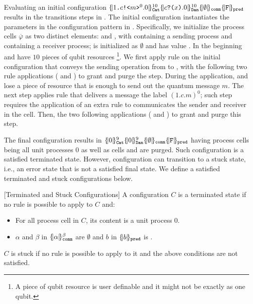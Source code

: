 Evaluating an initial configuration
{
$\pcell{\qsend{1}{c}{m}^0.0}{10}{\cn{Cat}}
\pcell{\qrev{c}{x}.0}{10}{\cn{Dan}} 
\qcell{\emptyset}{\cn{comm}}
\qcell{\texttt{F}}{\cn{pred}}$
}
results in the transitions steps in .
The initial configuration instantiates the parameters in the configuration pattern in .
Specifically, we initialize the process cells $\overline{\varphi}$ as two distinct elements:  and ,
with  containing a sending process and  containing a receiver process; 
 is initialized as $\emptyset$ and  has value .
In the beginning  and  have $10$ pieces of qubit resources \footnote{A piece of qubit resource is user definable and it might not be exactly as one qubit.}.
We first apply rule  on the initial configuration
that conveys the sending operation from  to ,
with the following two rule applications ( and ) to grant and purge the  step.
During the  application,  and  lose a piece of resource that is enough to send out the quantum message $m$. 
The next step applies rule  that delivers a message the label $(1.c.m)^0$;
such step requires the application of an extra rule  to communicates the sender and receiver in the  cell.
Then, the two following applications ( and ) to grant and purge this step.

The final configuration results in $\pcell{0}{9}{\cn{Cat}}
\pcell{0}{9}{\cn{Dan}} 
\qcell{\emptyset}{\cn{comm}}
\qcell{\texttt{F}}{\cn{pred}}$
having process cells being all unit processes $0$ as well as cells  and  are purged.
Such configuration is a satisfied terminated state. However, configuration can transition to a stuck state, i.e., an error state that is not a satisfied final state.
We define a satisfied terminated and stuck configurations below.

\begin{definition}\label{def:stuck}\rm[Terminated and Stuck Configurations]
A configuration $C$ is a terminated state if no rule is possible to apply to $C$ and:
\begin{itemize}
\item For all process cell in $C$, its content is a unit process $0$.
\item $\alpha$ and $\beta$ in $\{\!| \alpha |\!\}^{\beta}_{\texttt{comm}}$ are $\emptyset$ and $b$ in $\{\!| b |\!\}_{\texttt{pred}}$ is .
\end{itemize}
$C$ is stuck if no rule is possible to apply to it and the above conditions are not satisfied.
\end{definition}


